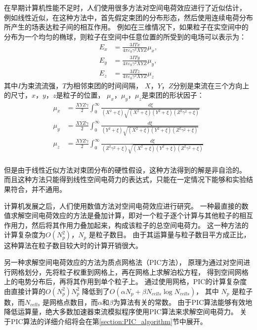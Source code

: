 在早期计算机性能不足时，人们使用很多方法对空间电荷效应进行了近似估计，
例如线性近似，在这种方法中，首先假定束团的分布形态，然后使用连续电荷分布所产生的场表达粒子间的相互作用。
例如在三维情况下，如果粒子在实空间中的分布为一个均匀的椭球，则粒子在空间中任意位置的所受到的电场可以表示为\cite{lv2004beamoptic}：
\begin{equation}
    \label{eq:SpaceCharge3D}
    \begin{aligned}
    E_x &= \frac{3ITx}{4 \pi {\varepsilon}_{0} {\gamma}^2 XYZ}{\mu}_x, \\
    E_y &= \frac{3ITy}{4 \pi {\varepsilon}_{0} {\gamma}^2 XYZ}{\mu}_y, \\
    E_z &= \frac{3ITz}{4 \pi {\varepsilon}_{0} {\gamma}^2 XYZ}{\mu}_z
    \end{aligned}
\end{equation}
其中$I$为束流流强，$T$为相邻束团的时间间隔，
$X$，$Y$，$Z$分别是束流在三个方向上的尺寸，$x$，$y$，$z$是粒子的位置，
${\mu}_x$，${\mu}_y$，${\mu}_z$是束团的形状因子：
\begin{equation}
    \label{eq:SpaceCharge3D_mu}
    \begin{aligned}
    {\mu}_x &= \frac{XYZ\gamma}{2}   \int_0^{\infty}
    \frac{d\xi}{(X^2+\xi)            \sqrt{(X^2+\xi)(Y^2+\xi)(Z^2 {\gamma}^2+\xi)}}  \\
    {\mu}_y &= \frac{XYZ\gamma}{2}   \int_0^{\infty}
    \frac{d\xi}{(Y^2+\xi)            \sqrt{(X^2+\xi)(Y^2+\xi)(Z^2 {\gamma}^2+\xi)}}  \\
    {\mu}_z &= \frac{XYZ\gamma}{2}   \int_0^{\infty}
    \frac{d\xi}{(Z^2 {\gamma}^2+\xi) \sqrt{(X^2+\xi)(Y^2+\xi)(Z^2 {\gamma}^2+\xi)}}  \\
    \end{aligned}
\end{equation}

但是由于线性近似方法对束团分布的硬性假设，这种方法得到的解是非自洽的。
而且这种方法只能得到线性空间电荷力的表达式，只能在一定情况下能够和实验结果符合，并不通用。

计算机发展之后，人们使用数值方法对空间电荷效应进行研究。
一种最直接的数值求解空间电荷效应的方法是叠加计算，即对一个粒子逐个计算与其他粒子的相互作用力，然后将其作用力叠加起来，构成该粒子的总空间电荷力。
这一种方法的计算复杂度为$O(N_p^2)$，$N_p$ 是粒子数目。
由于其运算量与粒子数目平方成正比，这种算法在粒子数目较大时的计算开销很大。

另一种求解空间电荷效应的方法为质点网格法（PIC方法），
原理为通过对空间进行网格划分，先将粒子权重到网格上，再在网格上求解泊松方程，
得到空间网格上的电势分布后，再将其作用到单个粒子上。
通过使用网格，PIC的计算复杂度由直接计算的$O(N_p^2)$$N_p^2$ 降低到了$O(\alpha N_p + \beta N_{cells}\log{N_{cells}})$，
其中 $N_p$ 是粒子数，而$N_{cells}$ 是网格点数目，而$\alpha$和$\beta$为算法有关的常数。
由于PIC算法能够有效地降低运算量，绝大多数加速器束流模拟程序使用PIC算法来求解空间电荷力。
关于PIC算法的详细介绍将会在第\ref{section:PIC_algorithm}节中展开。

